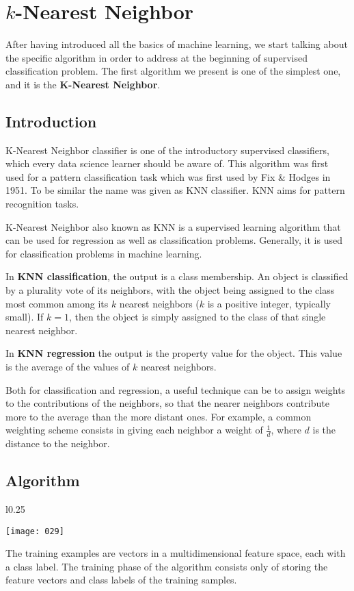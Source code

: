 \chapter{\(k\)-Nearest Neighbor}
After having introduced all the basics of machine learning, we start talking about the specific algorithm in order to address at the beginning of supervised classification problem. The first algorithm we present is one of the simplest one, and it is the \textbf{K-Nearest Neighbor}.

\section{Introduction}

K-Nearest Neighbor classifier is one of the introductory supervised classifiers, which every data science learner should be aware of. This algorithm was first used for a pattern classification task which was first used by Fix \& Hodges in 1951. To be similar the name was given as KNN classifier. KNN aims for pattern recognition tasks.  

K-Nearest Neighbor also known as KNN is a supervised learning algorithm that can be used for regression as well as classification problems. Generally, it is used for classification problems in machine learning. 

In \textbf{KNN classification}, the output is a class membership. An object is classified by a plurality vote of its neighbors, with the object being assigned to the class most common among its \(k\) nearest neighbors (\(k\) is a positive integer, typically small). If \(k=1\), then the object is simply assigned to the class of that single nearest neighbor. 

In \textbf{KNN regression} the output is the property value for the object. This value is the average of the values of \(k\) nearest neighbors.

Both for classification and regression, a useful technique can be to assign weights to the contributions of the neighbors, so that the nearer neighbors contribute more to the average than the more distant ones. For example, a common weighting scheme consists in giving each neighbor a weight of \(\frac 1 d\), where \(d\) is the distance to the neighbor.

\section{Algorithm}
\begin{wrapfigure}{l}{0.25\textwidth}
\begin{center}
    \texttt{[image: 029]}
    \caption{}
    \label{fig:029}
\end{center}
\end{wrapfigure}
The training examples are vectors in a multidimensional feature space, each with a class label. The training phase of the algorithm consists only of storing the feature vectors and class labels of the training samples.

